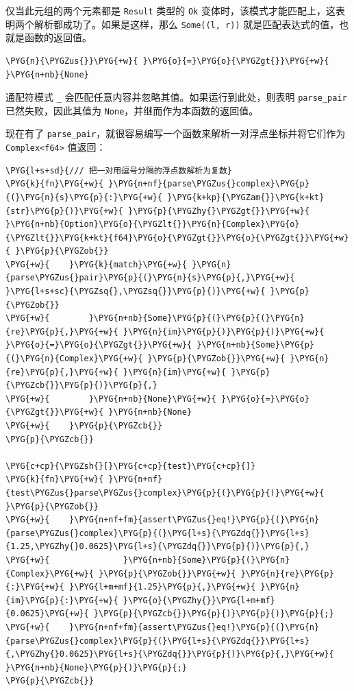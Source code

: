 仅当此元组的两个元素都是 \texttt{Result} 类型的 \texttt{Ok} 变体时，该模式才能匹配上，这表明两个解析都成功了。如果是这样，那么 \texttt{Some((l, r))} 就是匹配表达式的值，也就是函数的返回值。

\begin{Verbatim}[commandchars=\\\{\},breaklines=true,breakanywhere=true,fontsize=\codefont,xleftmargin=17bp]
\PYG{n}{\PYGZus{}}\PYG{+w}{ }\PYG{o}{=}\PYG{o}{\PYGZgt{}}\PYG{+w}{ }\PYG{n+nb}{None}
\end{Verbatim}

通配符模式 \texttt{\_} 会匹配任意内容并忽略其值。如果运行到此处，则表明 \texttt{parse\_pair} 已然失败，因此其值为 \texttt{None}，并继而作为本函数的返回值。

现在有了 \texttt{parse\_pair}，就很容易编写一个函数来解析一对浮点坐标并将它们作为 \texttt{Complex<f64>} 值返回：

\begin{Verbatim}[commandchars=\\\{\},breaklines=true,breakanywhere=true,fontsize=\codefont,xleftmargin=17bp]
\PYG{l+s+sd}{/// 把一对用逗号分隔的浮点数解析为复数}
\PYG{k}{fn}\PYG{+w}{ }\PYG{n+nf}{parse\PYGZus{}complex}\PYG{p}{(}\PYG{n}{s}\PYG{p}{:}\PYG{+w}{ }\PYG{k+kp}{\PYGZam{}}\PYG{k+kt}{str}\PYG{p}{)}\PYG{+w}{ }\PYG{p}{\PYGZhy{}\PYGZgt{}}\PYG{+w}{ }\PYG{n+nb}{Option}\PYG{o}{\PYGZlt{}}\PYG{n}{Complex}\PYG{o}{\PYGZlt{}}\PYG{k+kt}{f64}\PYG{o}{\PYGZgt{}}\PYG{o}{\PYGZgt{}}\PYG{+w}{ }\PYG{p}{\PYGZob{}}
\PYG{+w}{    }\PYG{k}{match}\PYG{+w}{ }\PYG{n}{parse\PYGZus{}pair}\PYG{p}{(}\PYG{n}{s}\PYG{p}{,}\PYG{+w}{ }\PYG{l+s+sc}{\PYGZsq{},\PYGZsq{}}\PYG{p}{)}\PYG{+w}{ }\PYG{p}{\PYGZob{}}
\PYG{+w}{        }\PYG{n+nb}{Some}\PYG{p}{(}\PYG{p}{(}\PYG{n}{re}\PYG{p}{,}\PYG{+w}{ }\PYG{n}{im}\PYG{p}{)}\PYG{p}{)}\PYG{+w}{ }\PYG{o}{=}\PYG{o}{\PYGZgt{}}\PYG{+w}{ }\PYG{n+nb}{Some}\PYG{p}{(}\PYG{n}{Complex}\PYG{+w}{ }\PYG{p}{\PYGZob{}}\PYG{+w}{ }\PYG{n}{re}\PYG{p}{,}\PYG{+w}{ }\PYG{n}{im}\PYG{+w}{ }\PYG{p}{\PYGZcb{}}\PYG{p}{)}\PYG{p}{,}
\PYG{+w}{        }\PYG{n+nb}{None}\PYG{+w}{ }\PYG{o}{=}\PYG{o}{\PYGZgt{}}\PYG{+w}{ }\PYG{n+nb}{None}
\PYG{+w}{    }\PYG{p}{\PYGZcb{}}
\PYG{p}{\PYGZcb{}}

\PYG{c+cp}{\PYGZsh{}[}\PYG{c+cp}{test}\PYG{c+cp}{]}
\PYG{k}{fn}\PYG{+w}{ }\PYG{n+nf}{test\PYGZus{}parse\PYGZus{}complex}\PYG{p}{(}\PYG{p}{)}\PYG{+w}{ }\PYG{p}{\PYGZob{}}
\PYG{+w}{    }\PYG{n+nf+fm}{assert\PYGZus{}eq!}\PYG{p}{(}\PYG{n}{parse\PYGZus{}complex}\PYG{p}{(}\PYG{l+s}{\PYGZdq{}}\PYG{l+s}{1.25,\PYGZhy{}0.0625}\PYG{l+s}{\PYGZdq{}}\PYG{p}{)}\PYG{p}{,}
\PYG{+w}{               }\PYG{n+nb}{Some}\PYG{p}{(}\PYG{n}{Complex}\PYG{+w}{ }\PYG{p}{\PYGZob{}}\PYG{+w}{ }\PYG{n}{re}\PYG{p}{:}\PYG{+w}{ }\PYG{l+m+mf}{1.25}\PYG{p}{,}\PYG{+w}{ }\PYG{n}{im}\PYG{p}{:}\PYG{+w}{ }\PYG{o}{\PYGZhy{}}\PYG{l+m+mf}{0.0625}\PYG{+w}{ }\PYG{p}{\PYGZcb{}}\PYG{p}{)}\PYG{p}{)}\PYG{p}{;}
\PYG{+w}{    }\PYG{n+nf+fm}{assert\PYGZus{}eq!}\PYG{p}{(}\PYG{n}{parse\PYGZus{}complex}\PYG{p}{(}\PYG{l+s}{\PYGZdq{}}\PYG{l+s}{,\PYGZhy{}0.0625}\PYG{l+s}{\PYGZdq{}}\PYG{p}{)}\PYG{p}{,}\PYG{+w}{ }\PYG{n+nb}{None}\PYG{p}{)}\PYG{p}{;}
\PYG{p}{\PYGZcb{}}
\end{Verbatim}

